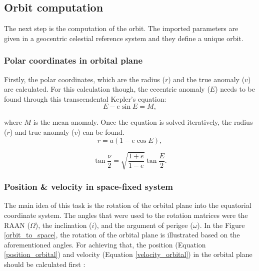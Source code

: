 \bigskip
\subsection{Orbit computation}
\bigskip

The next step is the computation of the orbit. The imported parameters are given in a geocentric celestial reference system and they define a unique orbit.

\bigskip
\subsubsection{Polar coordinates in orbital plane}
\bigskip

Firstly, the polar coordinates, which are the radius ($r$) and the true anomaly ($v$) are calculated. For this calculation though, the eccentric anomaly ($E$) needs to be found through this transcendental Kepler's equation:
\begin{equation}
E - e \sin{E} = M,
\end{equation}

where $M$ is the mean anomaly. Once the equation is solved iteratively, the radius ($r$) and true anomaly ($v$) can be found.
\begin{equation}
r = a(1 - e \cos{E}),
\end{equation}

\begin{equation}
\tan{\frac{\nu}{2}} = \sqrt{\frac{1 + e}{1 - e}} \tan{\frac{E}{2}}.
\end{equation}


\bigskip
\subsubsection{Position \& velocity in space-fixed system}
\bigskip

The main idea of this task is the rotation of the orbital plane into the equatorial coordinate system. The angles that were used to the rotation matrices were the RAAN ($\Omega$), the inclination ($i$), and the argument of perigee ($\omega$). In the Figure \ref{orbit_to_space}, the rotation of the orbital plane is illustrated based on the aforementioned angles. For achieving that, the position (Equation \ref{position_orbital}) and velocity (Equation \ref{velocity_orbital}) in the orbital plane should be calculated first \cite{Montenbruck}:

